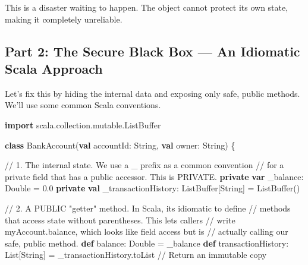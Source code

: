 \documentclass[
  letterpaper,
  DIV=11,
  numbers=noendperiod]{scrreprt}
\newenvironment{Shaded}{\begin{snugshade}}{\end{snugshade}}
\newcommand{\BuiltInTok}[1]{\textcolor[rgb]{0.00,0.23,0.31}{#1}}
\newcommand{\CommentTok}[1]{\textcolor[rgb]{0.37,0.37,0.37}{#1}}
\newcommand{\ExtensionTok}[1]{\textcolor[rgb]{0.00,0.23,0.31}{#1}}
\newcommand{\FloatTok}[1]{\textcolor[rgb]{0.68,0.00,0.00}{#1}}
\newcommand{\FunctionTok}[1]{\textcolor[rgb]{0.28,0.35,0.67}{#1}}
\newcommand{\KeywordTok}[1]{\textcolor[rgb]{0.00,0.23,0.31}{\textbf{#1}}}
\newcommand{\NormalTok}[1]{\textcolor[rgb]{0.00,0.23,0.31}{#1}}
\newcommand{\OperatorTok}[1]{\textcolor[rgb]{0.37,0.37,0.37}{#1}}
\begin{document}
This is a disaster waiting to happen. The object cannot protect its own
state, making it completely unreliable.

\subsection{Part 2: The Secure Black Box --- An Idiomatic Scala
Approach}\label{part-2-the-secure-black-box-an-idiomatic-scala-approach}

Let's fix this by hiding the internal data and exposing only safe,
public methods. We'll use some common Scala conventions.

\begin{Shaded}
\begin{Highlighting}[]
\KeywordTok{import}\NormalTok{ scala}\OperatorTok{.}\NormalTok{collection}\OperatorTok{.}\NormalTok{mutable}\OperatorTok{.}\BuiltInTok{ListBuffer}

\KeywordTok{class} \FunctionTok{BankAccount}\OperatorTok{(}\KeywordTok{val}\NormalTok{ accountId}\OperatorTok{:} \ExtensionTok{String}\OperatorTok{,} \KeywordTok{val}\NormalTok{ owner}\OperatorTok{:} \ExtensionTok{String}\OperatorTok{)} \OperatorTok{\{}

  \CommentTok{// 1. The internal state. We use a \textquotesingle{}\_\textquotesingle{} prefix as a common convention}
  \CommentTok{//    for a private field that has a public accessor. This is PRIVATE.}
  \KeywordTok{private} \KeywordTok{var}\NormalTok{ \_balance}\OperatorTok{:} \ExtensionTok{Double} \OperatorTok{=} \FloatTok{0.0}
  \KeywordTok{private} \KeywordTok{val}\NormalTok{ \_transactionHistory}\OperatorTok{:} \BuiltInTok{ListBuffer}\OperatorTok{[}\ExtensionTok{String}\OperatorTok{]} \OperatorTok{=} \BuiltInTok{ListBuffer}\OperatorTok{()}

  \CommentTok{// 2. A PUBLIC "getter" method. In Scala, it\textquotesingle{}s idiomatic to define}
  \CommentTok{//    methods that access state without parentheses. This lets callers}
  \CommentTok{//    write \textquotesingle{}myAccount.balance\textquotesingle{}, which looks like field access but is}
  \CommentTok{//    actually calling our safe, public method.}
  \KeywordTok{def}\NormalTok{ balance}\OperatorTok{:} \ExtensionTok{Double} \OperatorTok{=}\NormalTok{ \_balance}
  \KeywordTok{def}\NormalTok{ transactionHistory}\OperatorTok{:} \ExtensionTok{List}\OperatorTok{[}\ExtensionTok{String}\OperatorTok{]} \OperatorTok{=}\NormalTok{ \_transactionHistory}\OperatorTok{.}\NormalTok{toList }\CommentTok{// Return an immutable copy}


\end{Highlighting}
\end{Shaded}
\end{document}
